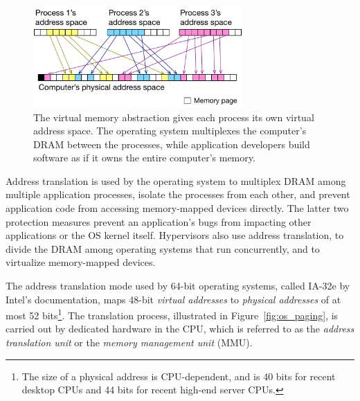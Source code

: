 \begin{figure}[hbt]
  \centering
  \includegraphics[width=80mm]{figures/virtual_memory.pdf}
  \caption{
    The virtual memory abstraction gives each process its own virtual address
    space. The operating system multiplexes the computer's DRAM between the
    processes, while application developers build software as if it owns the
    entire computer's memory.
  }
  \label{fig:virtual_memory}
\end{figure}

Address translation is used by the operating system to multiplex DRAM among
multiple application processes, isolate the processes from each other, and
prevent application code from accessing memory-mapped devices directly. The
latter two protection measures prevent an application's bugs from impacting
other applications or the OS kernel itself. Hypervisors also use address
translation, to divide the DRAM among operating systems that run concurrently,
and to virtualize memory-mapped devices.


The address translation mode used by 64-bit operating systems, called
IA-32e by Intel's documentation, maps 48-bit \textit{virtual addresses} to
\textit{physical addresses} of at most 52 bits\footnote{The size of a
physical address is CPU-dependent, and is 40 bits for recent desktop CPUs and
44 bits for recent high-end server CPUs.}. The translation process, illustrated
in Figure~\ref{fig:os_paging}, is carried out by dedicated hardware in the CPU,
which is referred to as the \textit{address translation unit} or the
\textit{memory management unit} (MMU).

